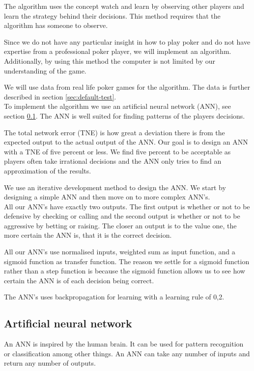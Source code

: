 The algorithm uses the concept watch and learn by observing other players and learn the strategy behind their decisions. This method requires that the algorithm has someone to observe.

Since we do not have any particular insight in how to play poker and do not have expertise from a professional poker player, we will implement an algorithm. Additionally, by using this method the computer is not limited by our understanding of the game. 

We will use data from real life poker games for the algorithm. The data is further described in section \ref{sec:default-test}.\\

To implement the algorithm we use an artificial neural network (ANN), see section \ref{sec:nn}. The ANN is well suited for finding patterns of the players decisions. 

The total network error (TNE) is how great a deviation there is from the expected output to the actual output of the ANN. Our goal is to design an ANN with a TNE of five percent or less. We find five percent to be acceptable as players often take irrational decisions and the ANN only tries to find an approximation of the results. 

We use an iterative development method to design the ANN. We start by designing a simple ANN and then move on to more complex ANN's.\\

All our ANN's have exactly two outputs. The first output is whether or not to be defensive by checking or calling and the second output is whether or not to be aggressive by betting or raising. The closer an output is to the value one, the more certain the ANN is, that it is the correct decision. 

All our ANN's use normalised inputs, weighted sum as input function, and a sigmoid function as transfer function. The reason we settle for a sigmoid function rather than a step function is because the sigmoid function allows us to see how certain the ANN is of each decision being correct.

The ANN's uses backpropagation for learning with a learning rule of 0,2.

\subsection{Artificial neural network}
\label{sec:nn}
An ANN is inspired by the human brain. It can be used for pattern recognition or classification among other things. An ANN can take any number of inputs and return any number of outputs. 

